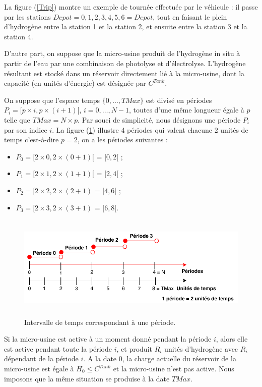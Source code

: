 La figure (\ref{Trip}) montre un exemple de tournée effectuée par le véhicule : il passe par les stations $Depot = 0, 1, 2, 3, 4, 5, 6 = Depot$, tout en faisant le plein d'hydrogène entre la station 1 et la station 2, et ensuite entre la station 3 et la station 4.

D'autre part, on suppose que la micro-usine produit de l'hydrogène in situ à partir de l'eau par une combinaison de photolyse et d'électrolyse. L'hydrogène résultant est stocké dans un réservoir directement lié à la micro-usine, dont la capacité (en unités d'énergie) est désignée par $C^{Tank}$. 

On suppose que l'espace temps $\{0, \dots, TMax\}$ est divisé en périodes $P_i = [p\times i, p\times(i+1)[$, $i=0, \dots, N-1$, toutes d'une même longueur égale à $p$ telle que $TMax= N \times p$. Par souci de simplicité, nous désignons une période $P_i$ par son indice $i$. La figure (\ref{periode}) illustre 4 périodes qui valent chacune 2 unités de temps c'est-à-dire $p=2$, on a les périodes suivantes :
\begin{itemize}[label=$\square$]
	\item $P_0 = [2\times 0, 2\times(0+1)[$ = $[0,2[$ ;
	\item $P_1 = [2\times 1, 2\times(1+1)[$ = $[2,4[$ ;
	\item $P_2 = [2\times 2, 2\times(2+1)$ = $[4,6[$ ;
	\item $P_3 = [2\times 3, 2\times(3+1)$ = $[6,8[$.
\end{itemize}

\begin{figure}[H]
	\centerline{
		\includegraphics[height=5cm]{images_these/Periode.pdf}}
	\caption[Intervalle de temps correspondant à une période]{Intervalle de temps correspondant à une période. }
	\label{periode}
\end{figure}

Si la micro-usine est active à un moment donné pendant la période $i$, alors elle est active pendant toute la période $i$, et produit $R_i$ unités d'hydrogène avec $R_i$ dépendant de la période $i$. A la date 0, la charge actuelle du réservoir de la micro-usine est égale à $H_0\leq C^{Tank}$ et la micro-usine n'est pas active. Nous imposons que la même situation se produise à la date $TMax$.

